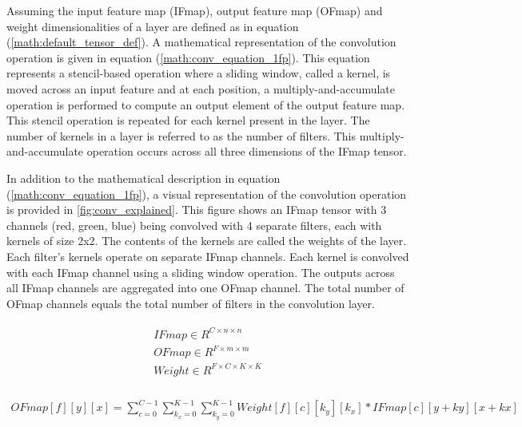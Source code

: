 Assuming the input feature map (IFmap), output feature map (OFmap) and weight
dimensionalities of a layer are defined as in equation
(\autoref{math:default_tensor_def}). A mathematical representation of the
convolution operation is given in equation (\autoref{math:conv_equation_1fp}).
This equation represents a stencil-based operation where a sliding window,
called a kernel, is moved across an input feature and at each position, a
multiply-and-accumulate operation is performed to compute an output element of
the output feature map. This stencil operation is repeated for each kernel
present in the layer. The number of kernels in a layer is referred to as the
number of filters. This multiply-and-accumulate operation occurs across all
three dimensions of the IFmap tensor.

In addition to the mathematical description in equation
(\autoref{math:conv_equation_1fp}), a visual representation of the convolution
operation is provided in \autoref{fig:conv_explained}. This figure shows an
IFmap tensor with 3 channels (red, green, blue) being convolved with 4 separate
filters, each with kernels of size 2x2. The contents of the kernels are called
the weights of the layer. Each filter's kernels operate on separate IFmap
channels. Each kernel is convolved with each IFmap channel using a sliding
window operation. The outputs across all IFmap channels are aggregated into one
OFmap channel. The total number of OFmap channels equals the total number of
filters in the convolution layer.


\begin{align}
    \begin{split}
        IFmap \in R^{C \times n\times n} \\
        OFmap \in  R^{F \times m\times m} \\
        Weight \in R^{F \times C\times K\times K} \\
    \end{split}
    \label{math:default_tensor_def}
\end{align}

\begin{align}
    OFmap[f][y][x] = \displaystyle\sum\limits_{c=0}^{C-1}\displaystyle\sum\limits_{k_x=0}^{K-1}\displaystyle\sum\limits_{k_y=0}^{K-1}Weight[f][c][k_y][k_x]*IFmap[c][y+ky][x+kx]
    \label{math:conv_equation_1fp}
\end{align}

